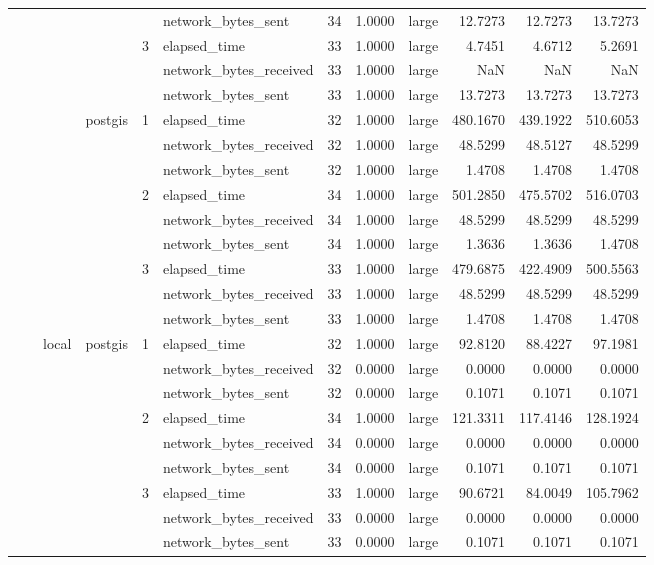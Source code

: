 \begin{tabular}{llllllrrlrrr}
 &  &  &  &  & network_bytes_sent & 34 & 1.0000 & large & 12.7273 & 12.7273 & 13.7273 \\
\cline{5-12}
 &  &  &  & \multirow[t]{3}{*}{3} & elapsed_time & 33 & 1.0000 & large & 4.7451 & 4.6712 & 5.2691 \\
 &  &  &  &  & network_bytes_received & 33 & 1.0000 & large & NaN & NaN & NaN \\
 &  &  &  &  & network_bytes_sent & 33 & 1.0000 & large & 13.7273 & 13.7273 & 13.7273 \\
\cline{4-12} \cline{5-12}
 &  &  & \multirow[t]{9}{*}{postgis} & \multirow[t]{3}{*}{1} & elapsed_time & 32 & 1.0000 & large & 480.1670 & 439.1922 & 510.6053 \\
 &  &  &  &  & network_bytes_received & 32 & 1.0000 & large & 48.5299 & 48.5127 & 48.5299 \\
 &  &  &  &  & network_bytes_sent & 32 & 1.0000 & large & 1.4708 & 1.4708 & 1.4708 \\
\cline{5-12}
 &  &  &  & \multirow[t]{3}{*}{2} & elapsed_time & 34 & 1.0000 & large & 501.2850 & 475.5702 & 516.0703 \\
 &  &  &  &  & network_bytes_received & 34 & 1.0000 & large & 48.5299 & 48.5299 & 48.5299 \\
 &  &  &  &  & network_bytes_sent & 34 & 1.0000 & large & 1.3636 & 1.3636 & 1.4708 \\
\cline{5-12}
 &  &  &  & \multirow[t]{3}{*}{3} & elapsed_time & 33 & 1.0000 & large & 479.6875 & 422.4909 & 500.5563 \\
 &  &  &  &  & network_bytes_received & 33 & 1.0000 & large & 48.5299 & 48.5299 & 48.5299 \\
 &  &  &  &  & network_bytes_sent & 33 & 1.0000 & large & 1.4708 & 1.4708 & 1.4708 \\
\cline{3-12} \cline{4-12} \cline{5-12}
 &  & \multirow[t]{9}{*}{local} & \multirow[t]{9}{*}{postgis} & \multirow[t]{3}{*}{1} & elapsed_time & 32 & 1.0000 & large & 92.8120 & 88.4227 & 97.1981 \\
 &  &  &  &  & network_bytes_received & 32 & 0.0000 & large & 0.0000 & 0.0000 & 0.0000 \\
 &  &  &  &  & network_bytes_sent & 32 & 0.0000 & large & 0.1071 & 0.1071 & 0.1071 \\
\cline{5-12}
 &  &  &  & \multirow[t]{3}{*}{2} & elapsed_time & 34 & 1.0000 & large & 121.3311 & 117.4146 & 128.1924 \\
 &  &  &  &  & network_bytes_received & 34 & 0.0000 & large & 0.0000 & 0.0000 & 0.0000 \\
 &  &  &  &  & network_bytes_sent & 34 & 0.0000 & large & 0.1071 & 0.1071 & 0.1071 \\
\cline{5-12}
 &  &  &  & \multirow[t]{3}{*}{3} & elapsed_time & 33 & 1.0000 & large & 90.6721 & 84.0049 & 105.7962 \\
 &  &  &  &  & network_bytes_received & 33 & 0.0000 & large & 0.0000 & 0.0000 & 0.0000 \\
 &  &  &  &  & network_bytes_sent & 33 & 0.0000 & large & 0.1071 & 0.1071 & 0.1071 \\
\cline{1-12} \cline{2-12} \cline{3-12} \cline{4-12} \cline{5-12}
\bottomrule
\end{tabular}
